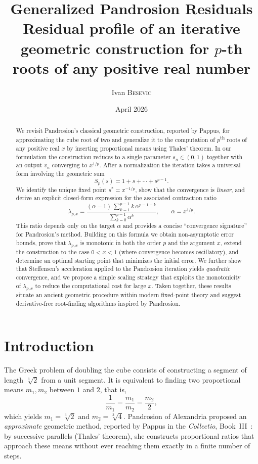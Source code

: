 \documentclass[11pt,a4paper]{article}
\title{\textbf{Generalized Pandrosion Residuals}\\[0.3em]
  \large Residual profile of an iterative geometric construction
  for $p$-th roots of any positive real number}
\author{Ivan \textsc{Besevic}}
\date{April 2026}
\theoremstyle{definition}
\newcommand{\cbrt}[1]{\sqrt[3]{#1}}
\begin{document}
\maketitle

\begin{abstract}
We revisit Pandrosion's classical geometric construction, reported by Pappus, for approximating the cube root of two and generalize it to the computation of $p$\textsuperscript{th} roots of any positive real $x$ by inserting proportional means using Thales' theorem.  In our formulation the construction reduces to a single parameter $s_n \in(0,1)$ together with an output $v_n$ converging to $x^{1/p}$.  After a normalization the iteration takes a universal form involving the geometric sum
\[
  S_p(s)=1+s+\cdots+s^{p-1}.
\]
We identify the unique fixed point $s^* = x^{-1/p}$, show that the convergence is \emph{linear}, and derive an explicit closed-form expression for the associated contraction ratio
\[
  \lambda_{p,x} = \frac{(\alpha - 1)\,\sum_{k=1}^{p-1} k\,\alpha^{p-1-k}}{\sum_{k=0}^{p-1} \alpha^k},
  \qquad \alpha = x^{1/p}.
\]
This ratio depends only on the target $\alpha$ and provides a concise ``convergence signature'' for Pandrosion's method.  Building on this formula we obtain non-asymptotic error bounds, prove that $\lambda_{p,x}$ is monotonic in both the order $p$ and the argument $x$, extend the construction to the case $0<x<1$ (where convergence becomes oscillatory), and determine an optimal starting point that minimizes the initial error.  We further show that Steffensen's acceleration applied to the Pandrosion iteration yields \emph{quadratic} convergence, and we propose a simple scaling strategy that exploits the monotonicity of $\lambda_{p,x}$ to reduce the computational cost for large $x$.  Taken together, these results situate an ancient geometric procedure within modern fixed-point theory and suggest derivative-free root-finding algorithms inspired by Pandrosion.
\end{abstract}

\tableofcontents
\bigskip

\section{Introduction}

The Greek problem of doubling the cube consists of constructing a segment of length $\cbrt{2}$ from a unit segment. It is equivalent to finding two proportional means $m_1, m_2$ between $1$ and $2$, that is,
\[
  \frac{1}{m_1} = \frac{m_1}{m_2} = \frac{m_2}{2},
\]
which yields $m_1 = \cbrt{2}$ and $m_2 = \cbrt{4}$. Pandrosion of Alexandria proposed an \emph{approximate} geometric method, reported by Pappus in the \textit{Collectio}, Book~III~\cite{pappus}: by successive parallels (Thales' theorem), she constructs proportional ratios that approach these means without ever reaching them exactly in a finite number of steps.
\end{document}
